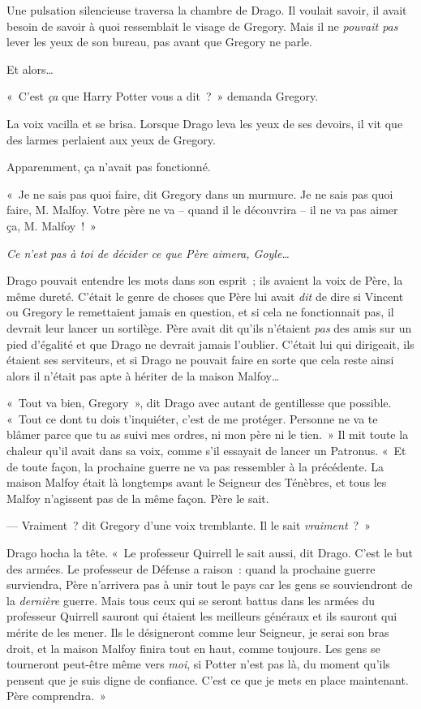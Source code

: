 Une pulsation silencieuse traversa la chambre de Drago. Il voulait savoir, il avait besoin de savoir à quoi ressemblait le visage de Gregory. Mais il ne \emph{pouvait pas} lever les yeux de son bureau, pas avant que Gregory ne parle.

Et alors…

«~C'est \emph{ça} que Harry Potter vous a dit~?~» demanda Gregory.

La voix vacilla et se brisa. Lorsque Drago leva les yeux de ses devoirs, il vit que des larmes perlaient aux yeux de Gregory.

Apparemment, ça n'avait pas fonctionné.

«~Je ne sais pas quoi faire, dit Gregory dans un murmure. Je ne sais pas quoi faire, M. Malfoy. Votre père ne va -- quand il le découvrira -- il ne va pas aimer ça, M. Malfoy~!~»

\emph{Ce n'est pas à toi de décider ce que Père aimera, Goyle…}

Drago pouvait entendre les mots dans son esprit~; ils avaient la voix de Père, la même dureté. C'était le genre de choses que Père lui avait \emph{dit} de dire si Vincent ou Gregory le remettaient jamais en question, et si cela ne fonctionnait pas, il devrait leur lancer un sortilège. Père avait dit qu'ils n'étaient \emph{pas} des amis sur un pied d'égalité et que Drago ne devrait jamais l'oublier. C'était lui qui dirigeait, ils étaient ses serviteurs, et si Drago ne pouvait faire en sorte que cela reste ainsi alors il n'était pas apte à hériter de la maison Malfoy…

«~Tout va bien, Gregory~», dit Drago avec autant de gentillesse que possible. «~Tout ce dont tu dois t'inquiéter, c'est de me protéger. Personne ne va te blâmer parce que tu as suivi mes ordres, ni mon père ni le tien.~» Il mit toute la chaleur qu'il avait dans sa voix, comme s'il essayait de lancer un Patronus. «~Et de toute façon, la prochaine guerre ne va pas ressembler à la précédente. La maison Malfoy était là longtemps avant le Seigneur des Ténèbres, et tous les Malfoy n'agissent pas de la même façon. Père le sait.

--- Vraiment~? dit Gregory d'une voix tremblante. Il le sait \emph{vraiment}~?~»

Drago hocha la tête. «~Le professeur Quirrell le sait aussi, dit Drago. C'est le but des armées. Le professeur de Défense a raison~: quand la prochaine guerre surviendra, Père n'arrivera pas à unir tout le pays car les gens se souviendront de la \emph{dernière} guerre. Mais tous ceux qui se seront battus dans les armées du professeur Quirrell sauront qui étaient les meilleurs généraux et ils sauront qui mérite de les mener. Ils le désigneront comme leur Seigneur, je serai son bras droit, et la maison Malfoy finira tout en haut, comme toujours. Les gens se tourneront peut-être même vers \emph{moi}, si Potter n'est pas là, du moment qu'ils pensent que je suis digne de confiance. C'est ce que je mets en place maintenant. Père comprendra.~»


